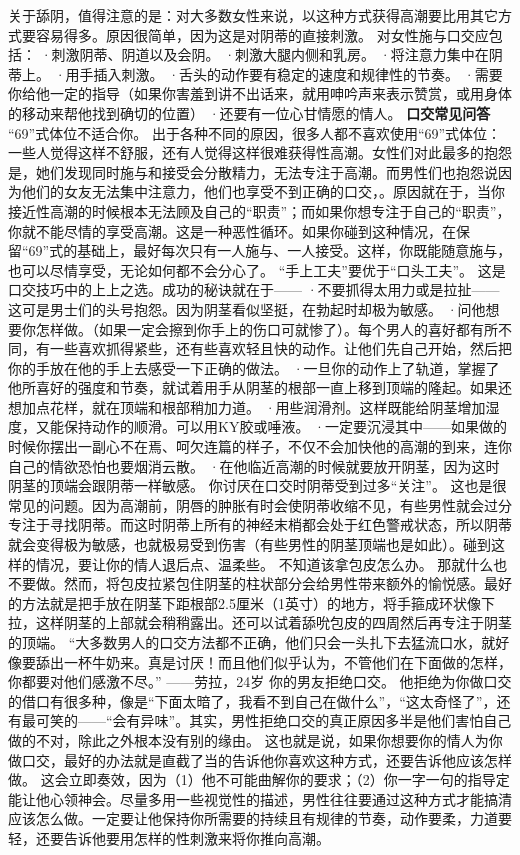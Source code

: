 \documentclass[12pt,UTF8,openany]{ctexbook}
\begin{document}
关于舔阴，值得注意的是：对大多数女性来说，以这种方式获得高潮要比用其它方式要容易得多。原因很简单，因为这是对阴蒂的直接刺激。
对女性施与口交应包括：
·刺激阴蒂、阴道以及会阴。
·刺激大腿内侧和乳房。
·将注意力集中在阴蒂上。
·用手插入刺激。
·舌头的动作要有稳定的速度和规律性的节奏。
·需要你给他一定的指导（如果你害羞到讲不出话来，就用呻吟声来表示赞赏，或用身体的移动来帮他找到确切的位置）
·还要有一位心甘情愿的情人。
\textbf{口交常见问答}
“69”式体位不适合你。
出于各种不同的原因，很多人都不喜欢使用“69”式体位：一些人觉得这样不舒服，还有人觉得这样很难获得性高潮。女性们对此最多的抱怨是，她们发现同时施与和接受会分散精力，无法专注于高潮。而男性们也抱怨说因为他们的女友无法集中注意力，他们也享受不到正确的口交，。原因就在于，当你接近性高潮的时候根本无法顾及自己的“职责”；而如果你想专注于自己的“职责”，你就不能尽情的享受高潮。这是一种恶性循环。如果你碰到这种情况，在保留“69”式的基础上，最好每次只有一人施与、一人接受。这样，你既能随意施与，也可以尽情享受，无论如何都不会分心了。
“手上工夫”要优于“口头工夫”。
这是口交技巧中的上上之选。成功的秘诀就在于——
·不要抓得太用力或是拉扯——这可是男士们的头号抱怨。因为阴茎看似坚挺，在勃起时却极为敏感。
·问他想要你怎样做。（如果一定会擦到你手上的伤口可就惨了）。每个男人的喜好都有所不同，有一些喜欢抓得紧些，还有些喜欢轻且快的动作。让他们先自己开始，然后把你的手放在他的手上去感受一下正确的做法。
·一旦你的动作上了轨道，掌握了他所喜好的强度和节奏，就试着用手从阴茎的根部一直上移到顶端的隆起。如果还想加点花样，就在顶端和根部稍加力道。
·用些润滑剂。这样既能给阴茎增加湿度，又能保持动作的顺滑。可以用KY胶或唾液。
·一定要沉浸其中——如果做的时候你摆出一副心不在焉、呵欠连篇的样子，不仅不会加快他的高潮的到来，连你自己的情欲恐怕也要烟消云散。
·在他临近高潮的时候就要放开阴茎，因为这时阴茎的顶端会跟阴蒂一样敏感。
你讨厌在口交时阴蒂受到过多“关注”。
这也是很常见的问题。因为高潮前，阴唇的肿胀有时会使阴蒂收缩不见，有些男性就会过分专注于寻找阴蒂。而这时阴蒂上所有的神经末梢都会处于红色警戒状态，所以阴蒂就会变得极为敏感，也就极易受到伤害（有些男性的阴茎顶端也是如此）。碰到这样的情况，要让你的情人退后点、温柔些。
不知道该拿包皮怎么办。
那就什么也不要做。然而，将包皮拉紧包住阴茎的柱状部分会给男性带来额外的愉悦感。最好的方法就是把手放在阴茎下距根部2.5厘米（1英寸）的地方，将手箍成环状像下拉，这样阴茎的上部就会稍稍露出。还可以试着舔吮包皮的四周然后再专注于阴茎的顶端。
“大多数男人的口交方法都不正确，他们只会一头扎下去猛流口水，就好像要舔出一杯牛奶来。真是讨厌！而且他们似乎认为，不管他们在下面做的怎样，你都要对他们感激不尽。”
——劳拉，24岁
你的男友拒绝口交。
他拒绝为你做口交的借口有很多种，像是“下面太暗了，我看不到自己在做什么”，“这太奇怪了”，还有最可笑的——“会有异味”。其实，男性拒绝口交的真正原因多半是他们害怕自己做的不对，除此之外根本没有别的缘由。
这也就是说，如果你想要你的情人为你做口交，最好的办法就是直截了当的告诉他你喜欢这种方式，还要告诉他应该怎样做。
这会立即奏效，因为（1）他不可能曲解你的要求；（2）你一字一句的指导定能让他心领神会。尽量多用一些视觉性的描述，男性往往要通过这种方式才能搞清应该怎么做。一定要让他保持你所需要的持续且有规律的节奏，动作要柔，力道要轻，还要告诉他要用怎样的性刺激来将你推向高潮。
\end{document}
